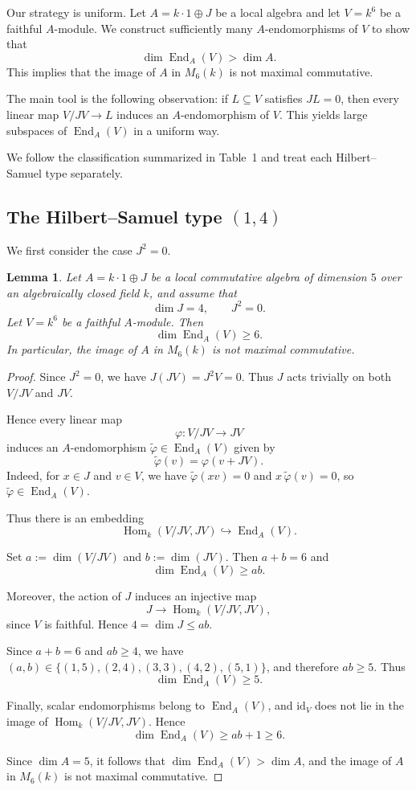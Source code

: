 \documentclass[11pt]{article}
\DeclareMathOperator{\End}{End}
\DeclareMathOperator{\Hom}{Hom}
\theoremstyle{plain}
\newtheorem{lemma}{Lemma}
\theoremstyle{remark}
\begin{document}
Our strategy is uniform. Let $A = k \cdot 1 \oplus J$ be a local algebra and let $V = k^6$ be a faithful $A$-module. We construct sufficiently many $A$-endomorphisms of $V$ to show that
\[
\dim \End_A(V) > \dim A.
\]
This implies that the image of $A$ in $M_6(k)$ is not maximal commutative.

The main tool is the following observation: if $L \subseteq V$ satisfies $JL = 0$, then every linear map $V/JV \to L$ induces an $A$-endomorphism of $V$. This yields large subspaces of $\End_A(V)$ in a uniform way.

We follow the classification summarized in Table~1 and treat each Hilbert--Samuel type separately.

\subsection{The Hilbert--Samuel type $(1,4)$}

We first consider the case $J^2 = 0$.

\begin{lemma}\label{lem:14}
	Let $A = k \cdot 1 \oplus J$ be a local commutative algebra of dimension $5$ over an algebraically closed field $k$, and assume that
	\[
	\dim J = 4, \qquad J^2 = 0.
	\]
	Let $V = k^6$ be a faithful $A$-module. Then
	\[
	\dim \End_A(V) \ge 6.
	\]
	In particular, the image of $A$ in $M_6(k)$ is not maximal commutative.
\end{lemma}

\begin{proof}
	Since $J^2=0$, we have $J(JV)=J^2V=0$. Thus $J$ acts trivially on both $V/JV$ and $JV$.
	
	Hence every linear map
	\[
	\varphi \colon V/JV \to JV
	\]
	induces an $A$-endomorphism $\widetilde{\varphi}\in \End_A(V)$ given by
	\[
	\widetilde{\varphi}(v)=\varphi(v+JV).
	\]
	Indeed, for $x\in J$ and $v\in V$, we have $\widetilde{\varphi}(xv)=0$ and $x\,\widetilde{\varphi}(v)=0$, so $\widetilde{\varphi}\in \End_A(V)$.
	
	Thus there is an embedding
	\[
	\Hom_k(V/JV,JV)\hookrightarrow \End_A(V).
	\]
	
	Set $a:=\dim(V/JV)$ and $b:=\dim(JV)$. Then $a+b=6$ and
	\[
	\dim \End_A(V)\ge ab.
	\]
	
	Moreover, the action of $J$ induces an injective map
	\[
	J \to \Hom_k(V/JV,JV),
	\]
	since $V$ is faithful. Hence $4=\dim J \le ab$.
	
	Since $a+b=6$ and $ab\ge 4$, we have $(a,b)\in \{(1,5),(2,4),(3,3),(4,2),(5,1)\}$, and therefore $ab\ge 5$. Thus
	\[
	\dim \End_A(V)\ge 5.
	\]
	
	Finally, scalar endomorphisms belong to $\End_A(V)$, and $\mathrm{id}_V$ does not lie in the image of $\Hom_k(V/JV,JV)$. Hence
	\[
	\dim \End_A(V)\ge ab+1\ge 6.
	\]
	
	Since $\dim A=5$, it follows that $\dim \End_A(V) > \dim A$, and the image of $A$ in $M_6(k)$ is not maximal commutative.
\end{proof}
\end{document}

